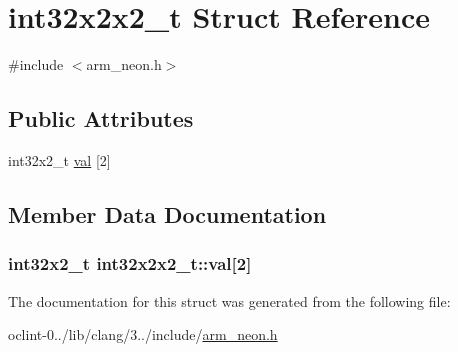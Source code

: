 \hypertarget{structint32x2x2__t}{\section{int32x2x2\-\_\-t Struct Reference}
\label{structint32x2x2__t}
}


{\ttfamily \#include $<$arm\-\_\-neon.\-h$>$}

\subsection*{Public Attributes}
\begin{DoxyCompactItemize}
\item 
int32x2\-\_\-t \hyperlink{structint32x2x2__t_a002c57928aea4c45d0dc4db4f74f7d1a}{val} \mbox{[}2\mbox{]}
\end{DoxyCompactItemize}


\subsection{Member Data Documentation}
\hypertarget{structint32x2x2__t_a002c57928aea4c45d0dc4db4f74f7d1a}{
\subsubsection[{val}]{\setlength{\rightskip}{0pt plus 5cm}int32x2\-\_\-t int32x2x2\-\_\-t\-::val\mbox{[}2\mbox{]}}}\label{structint32x2x2__t_a002c57928aea4c45d0dc4db4f74f7d1a}


The documentation for this struct was generated from the following file\-:\begin{DoxyCompactItemize}
\item 
oclint-\/0../lib/clang/3../include/\hyperlink{arm__neon_8h}{arm\-\_\-neon.\-h}\end{DoxyCompactItemize}
